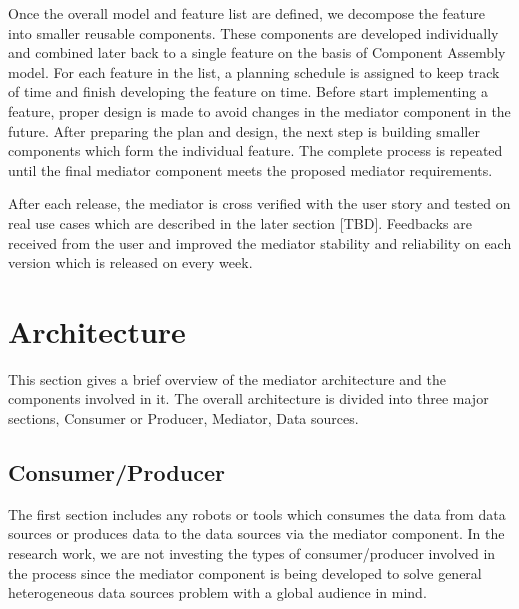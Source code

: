 	
	
	Once the overall model and feature list are defined, we decompose the feature into smaller reusable components. These components are developed individually and combined later back to a single feature on the basis of Component Assembly model. For each feature in the list, a planning schedule is assigned to keep track of time and finish developing the feature on time. Before start implementing a feature, proper design is made to avoid changes in the mediator component in the future. After preparing the plan and design, the next step is building smaller components which form the individual feature. The complete process is repeated until the final mediator component meets the proposed mediator requirements. 
	
	After each release, the mediator is cross verified with the user story and tested on real use cases which are described in the later section [TBD]. Feedbacks are received from the user and improved the mediator stability and reliability on each version which is released on every week.
	
	
	\section{Architecture} 
	This section gives a brief overview of the mediator architecture and the components involved in it.
	The overall architecture is divided into three major sections, Consumer or Producer, Mediator, Data sources.
	

	\subsection{Consumer/Producer}
	
	The first section includes any robots or tools which consumes the data from data sources or produces data to the data sources via the mediator component. In the research work, we are not investing the types of consumer/producer involved in the process since the mediator component is being developed to solve general heterogeneous data sources problem with a global audience in mind.
	
	\newpage
	

